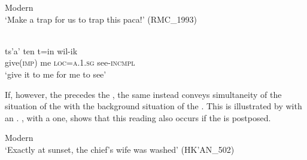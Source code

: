 \documentclass[output=paper]{langsci/langscibook}
\begin{document}
\ea\label{ex:lehmann:9} 
Modern  \\
\glt ‘Make a trap for us to trap this paca!’ (RMC\_1993)
\z

\newpage
\ea\label{ex:lehmann:10}
\\
\gll       ts'a'      ten  t=in        wil-ik\\
  give\textsc{(imp)}  me  \textsc{loc=a.1.sg}  see-\textsc{incmpl}\\
\glt `give it to me for me to see' \citep[63]{Bruce1968}
\z


If, however, the  precedes the , the same  instead conveys simultaneity of the situation of the  with the background situation of the . This is illustrated by  with an  . , with a  one, shows that this reading also occurs if the  is postposed.


\ea\label{ex:lehmann:11}
Modern  \\
\glt ‘Exactly at sunset, the chief's wife was washed’ (HK'AN\_502)
\z
\end{document}
